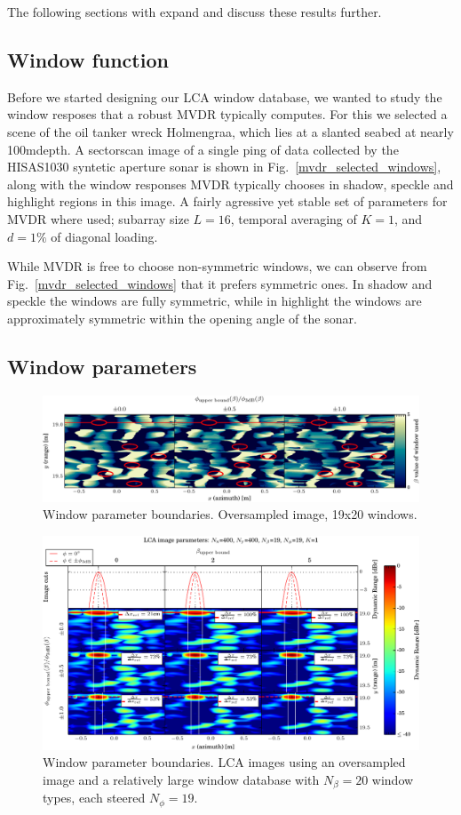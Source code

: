 \documentclass[10pt,journal,draftclsnofoot,onecolumn]{IEEEtran}
\let\MYoriglatexcaption\caption               %
\renewcommand{\caption}[2][\relax]{\MYoriglatexcaption[#2]{#2}}
\newcommand\Fig[1]{Fig.~\ref{#1}}
\newcommand\1{\vec 1}
\begin{document}
The following sections with expand and discuss these results further.

\subsection{Window function}

Before we started designing our LCA window database, we wanted to study the window resposes that a robust MVDR typically computes. For this we selected a scene of the oil tanker wreck Holmengraa, which lies at a slanted seabed at nearly 100m\;depth. A sectorscan image of a single ping of data collected by the HISAS1030 syntetic aperture sonar is shown in \Fig{mvdr_selected_windows}, along with the window responses MVDR typically chooses in shadow, speckle and highlight regions in this image. A fairly agressive yet stable set of parameters for MVDR where used; subarray size $L=16$, temporal averaging of $K=1$, and $d=1\%$ of diagonal loading.

While MVDR is free to choose non-symmetric windows, we can observe from \Fig{mvdr_selected_windows} that it prefers symmetric ones. In shadow and speckle the windows are fully symmetric, while in highlight the windows are approximately symmetric within the opening angle of the sonar. 


\subsection{Window parameters}





\begin{figure}[tbhp!]%
\includegraphics[width=.2\textwidth]{gfx/oversampling_mosaic_bounds_lca_windows_beta.pdf}%
\caption{Window parameter boundaries. Oversampled image, 19x20 windows.}\label{oversampling_mosaic_bounds}
\end{figure}

\newpage
\begin{figure}[tbhp!]%
\includegraphics[width=\textwidth]{gfx/oversampling_mosaic_bounds.pdf}%
\caption{Window parameter boundaries. LCA images using an oversampled image and a relatively large window database with $N_\beta=20$ window types, each steered $N_\phi=19$. }\label{oversampling_mosaic_bounds_beta}
\end{figure}
\end{document}
